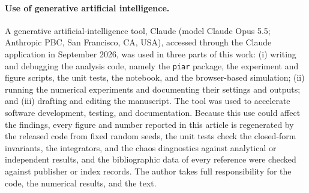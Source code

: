 \paragraph*{Use of generative artificial intelligence.} A generative artificial-intelligence tool, Claude (model Claude Opus 5.5; Anthropic PBC, San Francisco, CA, USA), accessed through the Claude application in September 2026, was used in three parts of this work: (i) writing and debugging the analysis code, namely the \texttt{piar} package, the experiment and figure scripts, the unit tests, the notebook, and the browser-based simulation; (ii) running the numerical experiments and documenting their settings and outputs; and (iii) drafting and editing the manuscript. The tool was used to accelerate software development, testing, and documentation. Because this use could affect the findings, every figure and number reported in this article is regenerated by the released code from fixed random seeds, the unit tests check the closed-form invariants, the integrators, and the chaos diagnostics against analytical or independent results, and the bibliographic data of every reference were checked against publisher or index records. The author takes full responsibility for the code, the numerical results, and the text.
